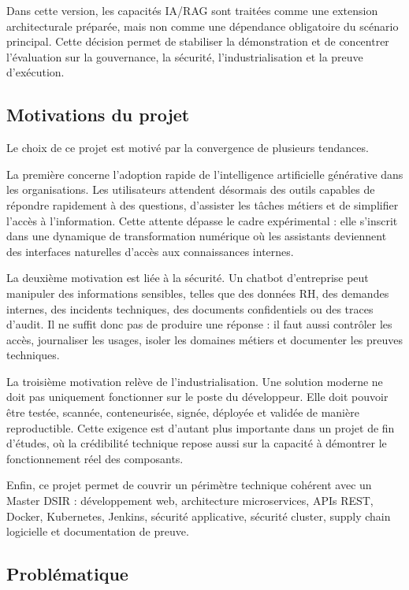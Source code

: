 Dans cette version, les capacités IA/RAG sont traitées comme une extension architecturale préparée, mais non comme une dépendance obligatoire du scénario principal. Cette décision permet de stabiliser la démonstration et de concentrer l’évaluation sur la gouvernance, la sécurité, l’industrialisation et la preuve d’exécution.

\subsection{Motivations du projet}

Le choix de ce projet est motivé par la convergence de plusieurs tendances.

La première concerne l’adoption rapide de l’intelligence artificielle générative dans les organisations. Les utilisateurs attendent désormais des outils capables de répondre rapidement à des questions, d’assister les tâches métiers et de simplifier l’accès à l’information. Cette attente dépasse le cadre expérimental : elle s’inscrit dans une dynamique de transformation numérique où les assistants deviennent des interfaces naturelles d’accès aux connaissances internes.

La deuxième motivation est liée à la sécurité. Un chatbot d’entreprise peut manipuler des informations sensibles, telles que des données RH, des demandes internes, des incidents techniques, des documents confidentiels ou des traces d’audit. Il ne suffit donc pas de produire une réponse : il faut aussi contrôler les accès, journaliser les usages, isoler les domaines métiers et documenter les preuves techniques.

La troisième motivation relève de l’industrialisation. Une solution moderne ne doit pas uniquement fonctionner sur le poste du développeur. Elle doit pouvoir être testée, scannée, conteneurisée, signée, déployée et validée de manière reproductible. Cette exigence est d’autant plus importante dans un projet de fin d’études, où la crédibilité technique repose aussi sur la capacité à démontrer le fonctionnement réel des composants.

Enfin, ce projet permet de couvrir un périmètre technique cohérent avec un Master DSIR : développement web, architecture microservices, APIs REST, Docker, Kubernetes, Jenkins, sécurité applicative, sécurité cluster, supply chain logicielle et documentation de preuve.

\subsection{Problématique}

